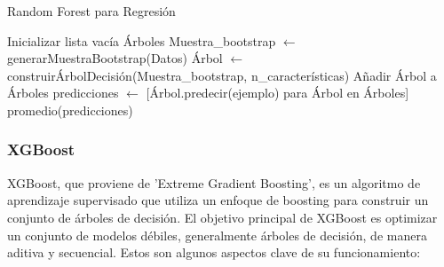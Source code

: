 \documentclass[12pt]{article}
\begin{document}
\begin{algorithm}
\caption{Random Forest para Regresión}
\begin{algorithmic}
    \State Inicializar lista vacía Árboles
        \State Muestra\_bootstrap $\leftarrow$ generarMuestraBootstrap(Datos)
        \State Árbol $\leftarrow$ construirÁrbolDecisión(Muestra\_bootstrap, n\_características)
        \State Añadir Árbol a Árboles
    \EndFor
        \State predicciones $\leftarrow$ [Árbol.predecir(ejemplo) para Árbol en Árboles]
        \State \Return promedio(predicciones)
    \EndProcedure
\EndProcedure
\end{algorithmic}
\end{algorithm}


\subsubsection{XGBoost}

XGBoost, que proviene de 'Extreme Gradient Boosting', es un algoritmo de aprendizaje supervisado que utiliza un enfoque de boosting para construir un conjunto de árboles de decisión. El objetivo principal de XGBoost es optimizar un conjunto de modelos débiles, generalmente árboles de decisión, de manera aditiva y secuencial. Estos son algunos aspectos clave de su funcionamiento:
\end{document}
